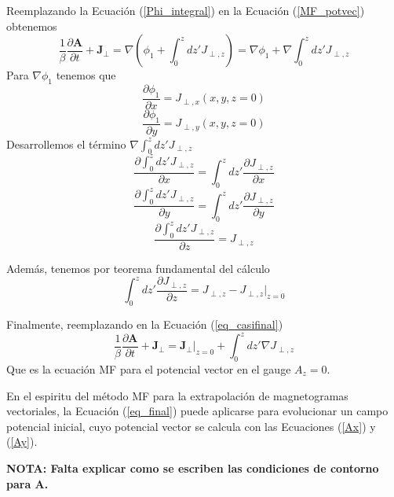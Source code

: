 \documentclass[a4paper,10pt]{article}
\def\bA{{\boldsymbol{A}}}
\def\bJ{{\boldsymbol{J}}}
\def\dt#1{\frac{\partial #1}{\partial t}}
\def\dx#1{\frac{\partial #1}{\partial x}}
\def\dy#1{\frac{\partial #1}{\partial y}}
\def\dz#1{\frac{\partial #1}{\partial z}}
\def\nota#1{{\bf NOTA: #1}}
\def\eq#1{Ecuación (\ref{#1})}
\def\eqs#1#2{Ecuaciones (\ref{#1}) y (\ref{#2})}
\def\jperp{\bJ_\perp}
\begin{document}
Reemplazando la \eq{Phi_integral} en la \eq{MF_potvec} obtenemos
\begin{equation}
  \frac{1}{\beta} \dt{\bA} + \jperp = \nabla \left(\phi_1 + \int_0^z dz' J_{\perp,z}\right) =
  \nabla \phi_1 + \nabla \int_0^z dz' J_{\perp,z}
  \label{eq_casifinal}
\end{equation} 
Para $\nabla \phi_1$ tenemos que 
\begin{equation}
 \dx{\phi_1}=J_{\perp,x}(x,y,z=0)
\end{equation}
\begin{equation}
 \dy{\phi_1}=J_{\perp,y}(x,y,z=0)
\end{equation}
Desarrollemos el término $\nabla \int_0^z dz' J_{\perp,z}$
\begin{equation}
 \dx{\int_0^z dz' J_{\perp,z}} =  \int_0^z dz' \dx{ J_{\perp,z}} 
\end{equation}
\begin{equation}
 \dy{\int_0^z dz' J_{\perp,z}} =  \int_0^z dz' \dy{ J_{\perp,z}} 
\end{equation}
\begin{equation}
 \dz{\int_0^z dz' J_{\perp,z}} =  { J_{\perp,z}} 
\end{equation}

Además, tenemos por teorema fundamental del cálculo
\begin{equation}
 \int_0^z dz' \dz{ J_{\perp,z}} = { J_{\perp,z}} - { J_{\perp,z}}\rvert_{z=0}
\end{equation}

Finalmente, reemplazando en la \eq{eq_casifinal}
\begin{equation}
 \frac{1}{\beta} \dt{\bA} + \jperp = \jperp\rvert_{z=0} +\int_0^z dz' \nabla J_{\perp,z}
 \label{eq_final}
\end{equation}
Que es la ecuación MF para el potencial vector en el gauge $A_z=0$.

En el espiritu del método MF para la extrapolación de magnetogramas vectoriales, la \eq{eq_final} puede aplicarse para evolucionar un campo potencial inicial, cuyo potencial vector se calcula con las \eqs{Ax}{Ay}.

\nota{Falta explicar como se escriben las condiciones de contorno para $\bA$.}
\end{document}
